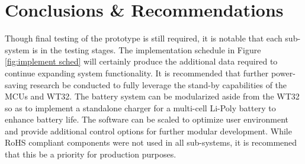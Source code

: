 \section[Conclusions \& Recommendations]{Conclusions \& Recommendations}
Though final testing of the prototype is still required, it is notable that each sub-system is
in the testing stages. The implementation schedule in Figure \ref{fig:implement sched} will
certainly produce the additional data required to continue expanding system functionality.
It is recommended that further power-saving research be conducted to fully leverage the 
stand-by capabilities of the MCUs and WT32. The battery system can be modularized aside from 
the WT32 so as to implement a standalone charger for a multi-cell Li-Poly battery to enhance
battery life. The software can be scaled to optimize user environment and provide additional control
options for further modular development. While RoHS compliant components were not used in all
sub-systems, it is recommened that this be a priority for production purposes.  